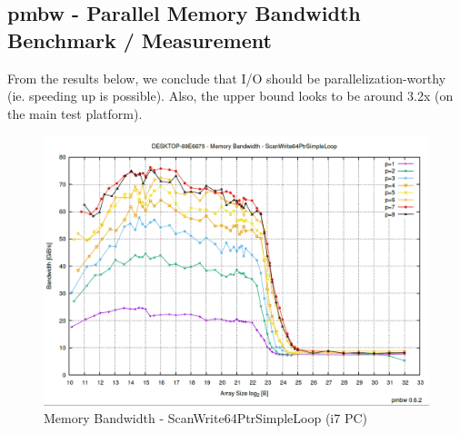 \documentclass{acm_proc_article-sp}
\begin{document}
\subsection{pmbw - Parallel Memory Bandwidth Benchmark / Measurement}
From the results below, we conclude that I/O should be parallelization-worthy (ie. speeding up is possible). Also, the upper bound looks to be around 3.2x (on the main test platform).
\begin{figure}[H]
  \includegraphics[width=\linewidth,natwidth=1211,natheight=850]{pmbw.png}
  \caption{Memory Bandwidth - ScanWrite64PtrSimpleLoop (i7 PC)}
  \label{fig:pmbw}
\end{figure}
\end{document}
